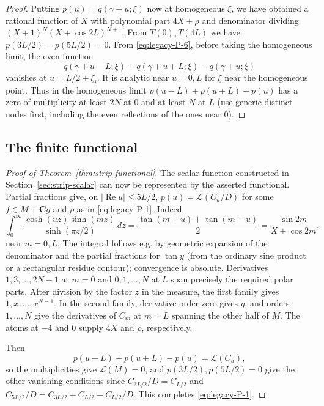 \begin{proof}
Putting $p(u)=q(\gamma+u;\xi)$ now at homogeneous $\xi$, we have obtained a rational function of $X$ with polynomial part $4X+\rho$ and denominator dividing $(X+1)^N(X+\cos 2L)^{N+1}$. From $T(0),T(4L)$ we have $p(3L/2)=p(5L/2)=0$. From \eqref{eq:legacy-P-6}, before taking the homogeneous limit, the even function
\[
 q(\gamma+u-L;\xi)+q(\gamma+u+L;\xi)-q(\gamma+u;\xi)
\]
vanishes at $u=L/2\pm\xi_i$. It is analytic near $u=0,L$ for $\xi$ near the homogeneous point. Thus in the homogeneous limit $p(u-L)+p(u+L)-p(u)$ has a zero of multiplicity at least $2N$ at 0 and at least $N$ at $L$ (use generic distinct nodes first, including the even reflections of the ones near 0).

\end{proof}

\subsection{The finite functional}

\begin{proof}[Proof of Theorem~\ref{thm:strip-functional}]
The scalar function constructed in Section~\ref{sec:strip-scalar} can now be represented by the asserted functional. Partial fractions give, on $|\operatorname{Re}u|\le5L/2$, $p(u)=\mathcal L(C_u/D)$ for some $f\in M+\mathbf C g$ and $\rho$ as in \eqref{eq:legacy-P-1}. Indeed
\[
 \int_0^\infty\frac{\cosh(uz)\sinh(mz)}{\sinh(\pi z/2)}\,dz
 =\frac{\tan(m+u)+\tan(m-u)}2=\frac{\sin 2m}{X+\cos 2m},
\]
near $m=0,L$. The integral follows e.g. by geometric expansion of the denominator and the partial fractions for $\tan y$ (from the ordinary sine product or a rectangular residue contour); convergence is absolute. Derivatives $1,3,\ldots,2N-1$ at $m=0$ and $0,1,\ldots,N$ at $L$ span precisely the required polar parts. After division by the factor $z$ in the measure, the first family gives $1,x,\ldots,x^{N-1}$. In the second family, derivative order zero gives $g$, and orders $1,\ldots,N$ give the derivatives of $C_m$ at $m=L$ spanning the other half of $M$. The atoms at $-4$ and $0$ supply $4X$ and $\rho$, respectively.

Then
\[
 p(u-L)+p(u+L)-p(u)=\mathcal L(C_u),
\]
so the multiplicities give $\mathcal L(M)=0$, and $p(3L/2),p(5L/2)=0$ give the other vanishing conditions since $C_{3L/2}/D=C_{L/2}$ and $C_{5L/2}/D=C_{3L/2}+C_{L/2}-C_{L/2}/D$. This completes \eqref{eq:legacy-P-1}.

\end{proof}
